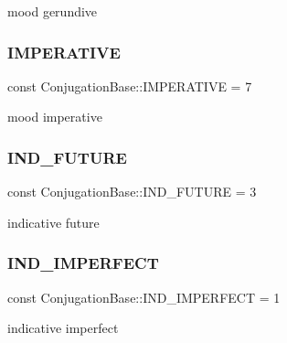 mood gerundive \hypertarget{classConjugationBase_ae4ec99d52ae2e6edd912cf67e78442bb}{}\label{classConjugationBase_ae4ec99d52ae2e6edd912cf67e78442bb} 
\subsubsection{\texorpdfstring{I\+M\+P\+E\+R\+A\+T\+I\+VE}{IMPERATIVE}}
{\footnotesize\ttfamily const Conjugation\+Base\+::\+I\+M\+P\+E\+R\+A\+T\+I\+VE = 7}

mood imperative \hypertarget{classConjugationBase_ac25ac0244050e86a405bbf6fa9043a3e}{}\label{classConjugationBase_ac25ac0244050e86a405bbf6fa9043a3e} 
\subsubsection{\texorpdfstring{I\+N\+D\+\_\+\+F\+U\+T\+U\+RE}{IND\_FUTURE}}
{\footnotesize\ttfamily const Conjugation\+Base\+::\+I\+N\+D\+\_\+\+F\+U\+T\+U\+RE = 3}

indicative future \hypertarget{classConjugationBase_aff9c382a23aa5533dfed3be1f01a6b2f}{}\label{classConjugationBase_aff9c382a23aa5533dfed3be1f01a6b2f} 
\subsubsection{\texorpdfstring{I\+N\+D\+\_\+\+I\+M\+P\+E\+R\+F\+E\+CT}{IND\_IMPERFECT}}
{\footnotesize\ttfamily const Conjugation\+Base\+::\+I\+N\+D\+\_\+\+I\+M\+P\+E\+R\+F\+E\+CT = 1}

indicative imperfect \hypertarget{classConjugationBase_a4b8516bbdb1525fc811738abeed0e1ff}{}\label{classConjugationBase_a4b8516bbdb1525fc811738abeed0e1ff} 
